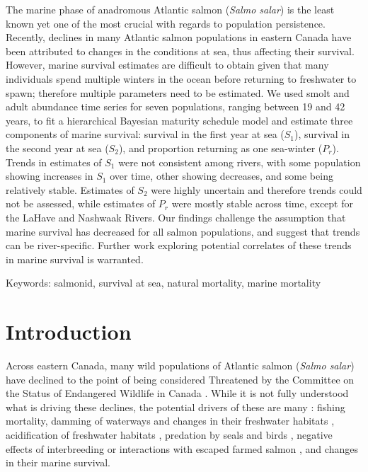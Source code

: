 \documentclass[12pt]{article}
\newcommand{\So}{$S_{1}$\xspace}
\newcommand{\St}{$S_{2}$\xspace}
\newcommand{\Pg}{$P_r$\xspace}
\begin{document}
The marine phase of anadromous Atlantic salmon (\emph{Salmo salar}) is the
least known yet one of the most crucial with regards to population
persistence.
Recently, declines in many Atlantic salmon populations in eastern Canada have
been attributed to changes in the conditions at sea, thus affecting their
survival.
However, marine survival estimates are difficult to obtain given that many
individuals spend multiple winters in the ocean before returning to freshwater to
spawn; therefore multiple parameters need to be estimated.
We used smolt and adult abundance time series for seven populations, ranging between 19 and 42 years,
to fit a hierarchical Bayesian maturity schedule model and estimate three components of
marine survival: survival in the first year at sea (\So), survival in the second year
at sea (\St), and proportion returning as one sea-winter (\Pg).
Trends in estimates of \So were not consistent among rivers, with some population showing increases in \So over
time, other showing decreases, and some being relatively stable.
Estimates of \St were highly uncertain and therefore trends could not be assessed, while 
estimates of \Pg were mostly stable across time, except for the LaHave and Nashwaak Rivers.
Our findings challenge the assumption that marine survival has decreased for
all salmon populations, and suggest that trends can be river-specific. 
Further work exploring potential correlates of these trends in marine survival
is warranted.



Keywords: salmonid, survival at sea, natural mortality, marine mortality


\section*{Introduction} %

Across eastern Canada, many wild populations of Atlantic salmon (\emph{Salmo salar})
have declined to the point of being considered Threatened by the 
Committee on the Status of Endangered Wildlife in Canada \citep[COSEWIC, ][]{Cosewic2010}.
While it is not fully understood what is driving these declines, the potential
drivers of these are many \citep[see ][for a detailed discussion of possible
causes]{Cairns2001}: fishing mortality, damming of waterways
and changes in their freshwater habitats \citep{Dunfield1985}, acidification
of freshwater habitats \citep[particularly in the Southern Uplands region of
NS, see][]{Gibson2010}, predation by seals and birds \citep{Cairns2000}, negative
effects of interbreeding or interactions with escaped farmed salmon
\citep{Keyser2018}, and changes in their marine survival.
\end{document}
